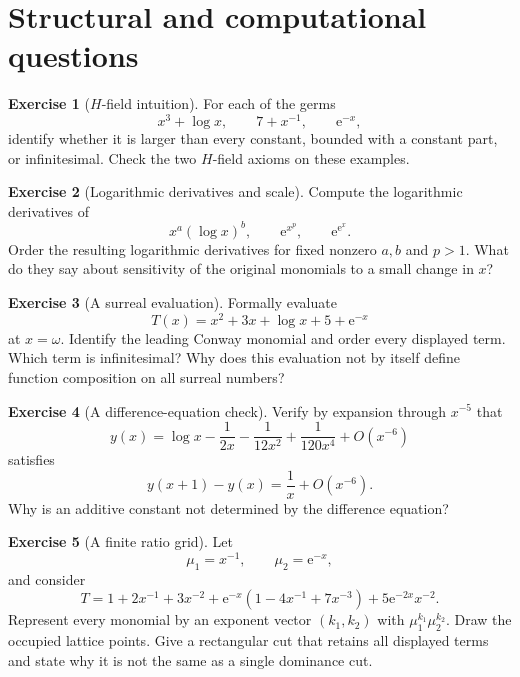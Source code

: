 \documentclass[11pt,oneside]{book}
\theoremstyle{definition}
\newtheorem{exercise}{Exercise}[chapter]
\theoremstyle{remark}
\newcommand{\e}{\mathrm{e}}
\newcommand{\bigO}{O}
\begin{document}
\section{Structural and computational questions}

\begin{exercise}[$H$-field intuition]
\label{ex:h-field-intuition}
For each of the germs
\[
  x^3+\log x,\qquad 7+x^{-1},\qquad \e^{-x},
\]
identify whether it is larger than every constant, bounded with a constant part,
or infinitesimal. Check the two $H$-field axioms on these examples.
\end{exercise}

\begin{exercise}[Logarithmic derivatives and scale]
\label{ex:log-derivative-scale}
Compute the logarithmic derivatives of
\[
  x^a(\log x)^b,
  \qquad \e^{x^p},
  \qquad \e^{\e^x}.
\]
Order the resulting logarithmic derivatives for fixed nonzero $a,b$ and $p>1$.
What do they say about sensitivity of the original monomials to a small change in
$x$?
\end{exercise}

\begin{exercise}[A surreal evaluation]
\label{ex:surreal-evaluation}
Formally evaluate
\[
  T(x)=x^2+3x+\log x+5+\e^{-x}
\]
at $x=\omega$. Identify the leading Conway monomial and order every displayed
term. Which term is infinitesimal? Why does this evaluation not by itself define
function composition on all surreal numbers?
\end{exercise}

\begin{exercise}[A difference-equation check]
\label{ex:digamma-check}
Verify by expansion through $x^{-5}$ that
\[
  y(x)=\log x-\frac1{2x}-\frac1{12x^2}
       +\frac1{120x^4}+\bigO(x^{-6})
\]
satisfies
\[
  y(x+1)-y(x)=\frac1x+\bigO(x^{-6}).
\]
Why is an additive constant not determined by the difference equation?
\end{exercise}

\begin{exercise}[A finite ratio grid]
\label{ex:ratio-grid}
Let
\[
  \mu_1=x^{-1},\qquad\mu_2=\e^{-x},
\]
and consider
\[
  T=1+2x^{-1}+3x^{-2}+\e^{-x}(1-4x^{-1}+7x^{-3})
    +5\e^{-2x}x^{-2}.
\]
Represent every monomial by an exponent vector $(k_1,k_2)$ with
$\mu_1^{k_1}\mu_2^{k_2}$. Draw the occupied lattice points. Give a rectangular
cut that retains all displayed terms and state why it is not the same as a
single dominance cut.
\end{exercise}
\end{document}
